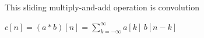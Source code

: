 \documentclass[aspectratio=169,11pt]{beamer}
\newcommand{\CardTitleSize}{\large}
\newcommand{\CardTitle}[1]{%
  \vspace{0.15cm}
  {\CardTitleSize\bfseries #1}\par
}
\begin{document}
\begin{frame}{This sliding multiply-and-add operation is convolution}

\begin{BlueBox}[
  calloutshadedblue,
  fontupper=\Large,
  halign=center
]{}
\(
c[n]=(a*b)[n]=\sum_{k=-\infty}^{\infty}a[k]\,b[n-k]
\)
\end{BlueBox}

















\end{frame}
\end{document}
